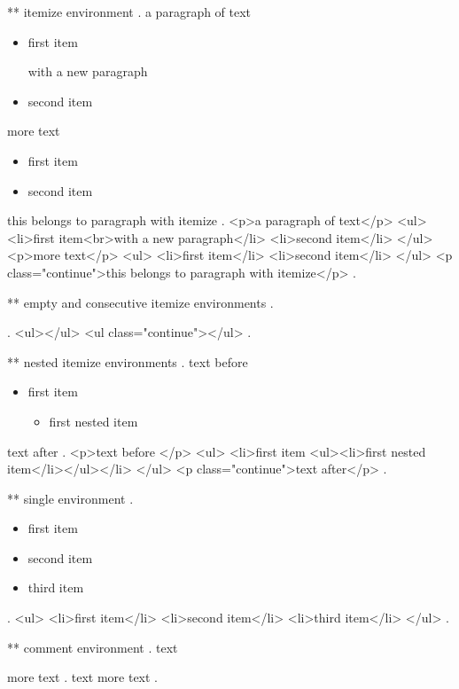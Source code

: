 ** itemize environment
.
a paragraph of text

\begin{itemize}
    \item first item

        with a new paragraph
    \item second item
\end{itemize}

more text

\begin{itemize}
    \item first item
    \item second item
\end{itemize}
this belongs to paragraph with itemize
.
<p>a paragraph of text</p>
<ul>
<li>ﬁrst item<br>with a new paragraph</li>
<li>second item</li>
</ul>
<p>more text</p>
<ul>
<li>ﬁrst item</li>
<li>second item</li>
</ul>
<p class="continue">this belongs to paragraph with itemize</p>
.


** empty and consecutive itemize environments
.
\begin{itemize}
\end{itemize}
\begin{itemize}
\end{itemize}
.
<ul></ul>
<ul class="continue"></ul>
.


** nested itemize environments
.
text before
\begin{itemize}
    \item first item
        \begin{itemize}
            \item first nested item
        \end{itemize}
\end{itemize}
text after
.
<p>text before </p>
<ul>
<li>ﬁrst item <ul><li>ﬁrst nested item</li></ul></li>
</ul>
<p class="continue">text after</p>
.


** single environment
.
\begin{itemize}
    \item first item
    \item second item
    \item third item
\end{itemize}
.
<ul>
<li>ﬁrst item</li>
<li>second item</li>
<li>third item</li>
</ul>
.


** comment environment
.
text
\begin{comment}
    This is a comment.
\end{comment}
more text
.
text
more text
.